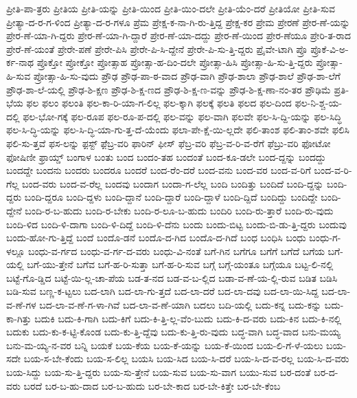 {ಪ್ರೀತಿ-ಪಾ-ತ್ರರು
ಪ್ರೀತಿಯ
ಪ್ರೀತಿ-ಯನ್ನು
ಪ್ರೀತಿ-ಯಿಂದ
ಪ್ರೀತಿ-ಯಿಂ-ದಲೇ
ಪ್ರೀತಿ-ಯೆಂ-ದರೆ
ಪ್ರೀತಿಯೋ
ಪ್ರೀತಿ-ಸುವ
ಪ್ರೀತ್ಯಾ-ದ-ರ-ಗ-ಳಿಂದ
ಪ್ರೀತ್ಯಾ-ದ-ರ-ಗಳೂ
ಪ್ರೆಮ
ಪ್ರೇಕ್ಷ-ಕ-ನಾ-ಗಿ-ರು-ತ್ತಿದ್ದ
ಪ್ರೇಕ್ಷ-ಕರ
ಪ್ರೇಮ
ಪ್ರೇರಣೆ
ಪ್ರೇರ-ಣೆ-ಯನ್ನು
ಪ್ರೇರ-ಣೆ-ಯಾ-ಗಿ-ದ್ದರು
ಪ್ರೇರ-ಣೆ-ಯಾ-ಗಿ-ದ್ದಾರೆ
ಪ್ರೇರ-ಣೆ-ಯಾ-ದದ್ದು
ಪ್ರೇರ-ಣೆ-ಯಿಂದ
ಪ್ರೇರ-ಣೆಯೂ
ಪ್ರೇರಿ-ತ-ರಾದ
ಪ್ರೇರೆ-ಣೆ-ಯಂತೆ
ಪ್ರೇರೇ-ಪಣೆ
ಪ್ರೇರೇ-ಪಿಸಿ
ಪ್ರೇರೇ-ಪಿ-ಸಿ-ದ್ದೇನೆ
ಪ್ರೇರೇ-ಪಿ-ಸು-ತ್ತಿ-ದ್ದರು
ಪ್ರೈವೇ-ಟಾಗಿ
ಪ್ರೊ
ಪ್ರೊಕೆ-ವಿ-ಅ-ರ್ಕ-ನಾಥ
ಪ್ರೊಕ್ತೋ
ಪ್ರೋಕ್ತೋ
ಪ್ರೋತ್ಸಾಹ
ಪ್ರೋತ್ಸಾ-ಹ-ದಿಂ-ದಲೇ
ಪ್ರೋತ್ಸಾ-ಹಿಸಿ
ಪ್ರೋತ್ಸಾ-ಹಿ-ಸು-ತ್ತಿ-ದ್ದರು
ಪ್ರೋತ್ಸಾ-ಹಿ-ಸುವ
ಪ್ರೋತ್ಸಾ-ಹಿ-ಸು-ವುದು
ಪ್ರೌಢ
ಪ್ರೌಢ-ಪಾ-ಠ-ವಾದ
ಪ್ರೌಢ-ವಾಗಿ
ಪ್ರೌಢ-ಶಾಲಾ
ಪ್ರೌಢ-ಶಾಲೆ
ಪ್ರೌಢ-ಶಾ-ಲೆಗೆ
ಪ್ರೌಢ-ಶಾ-ಲೆ-ಯಲ್ಲಿ
ಪ್ರೌಢ-ಶಿ-ಕ್ಷಣ
ಪ್ರೌಢ-ಶಿ-ಕ್ಷ-ಣದ
ಪ್ರೌಢ-ಶಿ-ಕ್ಷ-ಣ-ವನ್ನು
ಪ್ರೌಢ-ಶಿ-ಕ್ಷ-ಣಾ-ನಂ-ತರ
ಪ್ರೌಢಿಮೆ
ಪ್ರತಿ-ಭೆಯ
ಫಲ
ಫಲಂ
ಫಲಂತಿ
ಫಲ-ಕಾ-ರಿ-ಯಾ-ಗ-ಲಿಲ್ಲ
ಫಲ-ಕ್ಕಾಗಿ
ಫಲಕ್ಕೆ
ಫಲತಿ
ಫಲದ
ಫಲ-ದಿಂದ
ಫಲ-ನಿ-ಶ್ಚ-ಯ-ದಲ್ಲಿ
ಫಲ-ಭೋ-ಗಕ್ಕೆ
ಫಲ-ರೂಪ
ಫಲ-ರೂ-ಪ-ದಲ್ಲಿ
ಫಲ-ವನ್ನು
ಫಲ-ವಾಗಿ
ಫಲವೇ
ಫಲ-ಸಿ-ದ್ದಿ-ಯನ್ನು
ಫಲ-ಸಿದ್ಧಿ
ಫಲ-ಸಿ-ದ್ಧಿ-ಯನ್ನು
ಫಲ-ಸಿ-ದ್ಧಿ-ಯಾ-ಗು-ತ್ತ-ದೆ-ಯೆಂದು
ಫಲಾ-ಪೇ-ಕ್ಷೆ-ಯಿ-ಲ್ಲದೇ
ಫಲಿ-ತಾಂಶ
ಫಲಿ-ತಾಂ-ಶವೇ
ಫಲಿಸಿ
ಫಲಿ-ಸು-ತ್ತವೆ
ಫಸ-ಲನ್ನು
ಫ಼ಸ್ಟ್
ಫ಼ೆಬ್ರ-ವರಿ
ಫಾರಿನ್
ಫೀಸ್
ಫೆಬ್ರ-ವರಿ
ಫೆಬ್ರ-ವ-ರಿ-ವ-ರೆಗೆ
ಫೆಬ್ರು-ವರಿ
ಫೋಟೋ
ಫೋಷಿಣೀ
ಫ್ರಾಯ್ಡ್
ಬಂಗಾಳ
ಬಂತು
ಬಂದ
ಬಂದಂ-ತಹ
ಬಂದಂತೆ
ಬಂದ-ಕೂ-ಡಲೇ
ಬಂದ-ದ್ದನ್ನು
ಬಂದದ್ದು
ಬಂದದ್ದೇ
ಬಂದನು
ಬಂದರು
ಬಂದರೂ
ಬಂದರೆ
ಬಂದ-ರೆಂ-ದರೆ
ಬಂದ-ವನು
ಬಂದ-ವರ
ಬಂದ-ವ-ರಿಗೆ
ಬಂದ-ವ-ರಿ-ಗೆಲ್ಲ
ಬಂದ-ವರು
ಬಂದ-ವ-ರೆಲ್ಲ
ಬಂದವು
ಬಂದಾಗ
ಬಂದಾ-ಗ-ಲೆಲ್ಲ
ಬಂದಿ
ಬಂದಿತ್ತು
ಬಂದಿದೆ
ಬಂದಿ-ದ್ದನ್ನು
ಬಂದಿ-ದ್ದರು
ಬಂದಿ-ದ್ದರೂ
ಬಂದಿ-ದ್ದಳು
ಬಂದಿ-ದ್ದಾನೆ
ಬಂದಿ-ದ್ದಾರೆ
ಬಂದಿ-ದ್ದಾಳೆ
ಬಂದಿ-ದ್ದಿದೆ
ಬಂದಿದ್ದು
ಬಂದಿದ್ದೇ
ಬಂದಿ-ದ್ದೇನೆ
ಬಂದಿ-ರ-ಬ-ಹುದು
ಬಂದಿ-ರ-ಬೇಕು
ಬಂದಿ-ರ-ಲೂ-ಬ-ಹುದು
ಬಂದಿರಿ
ಬಂದಿ-ರು-ತ್ತಾರೆ
ಬಂದಿ-ರು-ವುದು
ಬಂದಿ-ಳಿದ
ಬಂದಿ-ಳಿ-ದಾಗಾ
ಬಂದಿ-ಳಿ-ದಿದ್ದೆ
ಬಂದಿ-ಳಿ-ದೆನು
ಬಂದು
ಬಂದು-ಬಿಟ್ಟ
ಬಂದು-ಬಿ-ಡು-ತ್ತಿ-ದ್ದರು
ಬಂದುವು
ಬಂದು-ಹೋ-ಗು-ತ್ತಿದ್ದೆ
ಬಂದೆ
ಬಂದೊ-ಡನೆ
ಬಂದೊ-ದ-ಗಿದ
ಬಂದೊ-ದ-ಗಿದೆ
ಬಂಧ
ಬಂಧಿಸಿ
ಬಂಧು
ಬಂಧು-ಗ-ಳಲ್ಲೂ
ಬಂಧು-ವ-ರ್ಗದ
ಬಂಧು-ವ-ರ್ಗ-ದ-ವರು
ಬಂಧು-ವಿ-ನಂತೆ
ಬಗೆ-ಗಿನ
ಬಗೆಗೂ
ಬಗೆಗೆ
ಬಗೆದೆ
ಬಗೆಯ
ಬಗೆ-ಯಲ್ಲಿ
ಬಗೆ-ಯು-ತ್ತೇನೆ
ಬಗೆವ
ಬಗೆ-ಹ-ರಿ-ಸುತ್ತಾ
ಬಗೆ-ಹ-ರಿ-ಸುವ
ಬಗ್ಗೆ
ಬಗ್ಗೆ-ಯಂತೂ
ಬಗ್ಗೆಯೂ
ಬಟ್ಟ-ಲಿ-ನಲ್ಲಿ
ಬಟ್ಟೆ-ಗೊ-ಡ್ಡಿದ
ಬಟ್ಟೆ-ಯಿ-ಲ್ಲ-ಚಾ-ಪೆಯ
ಬಡ-ತ-ನದ
ಬಡ-ವ-ಬ-ಲ್ಲಿದ
ಬಡಾ-ವ-ಣೆ-ಯ-ಲ್ಲಿ-ರುವ
ಬಡಿತ
ಬಡಿಸಿ
ಬಡಿ-ಸುವ
ಬಣ್ಣ-ಕ-ಟ್ಟಲು
ಬದ-ಲಾಗಿ
ಬದ-ಲಾ-ಗು-ತ್ತದೆ
ಬದ-ಲಾ-ದರೆ
ಬದ-ಲಾ-ದವು
ಬದ-ಲಾ-ಯಿ-ಸಿದ್ದ
ಬದ-ಲಾ-ವ-ಣೆ-ಗಳ
ಬದ-ಲಾ-ವ-ಣೆ-ಗ-ಳಾ-ಗಿವೆ
ಬದ-ಲಾ-ವ-ಣೆ-ಯಾಗಿ
ಬದಲು
ಬದಿ-ಯಲ್ಲಿ
ಬದು-ಕನ್ನ
ಬದು-ಕನ್ನು
ಬದು-ಕಾ-ಗಿತ್ತು
ಬದುಕಿ
ಬದು-ಕಿ-ಗಾಗಿ
ಬದು-ಕಿಗೆ
ಬದು-ಕಿ-ತ್ತಿ-ಲ್ಲ-ವೆಂ-ಬುದು
ಬದು-ಕಿ-ದ-ವರು
ಬದು-ಕಿನ
ಬದು-ಕಿ-ನಲ್ಲಿ
ಬದುಕು
ಬದು-ಕು-ಕ-ಟ್ಟಿ-ಕೊಂಡ
ಬದು-ಕು-ತ್ತಿ-ದ್ದೆವು
ಬದು-ಕು-ತ್ತಿ-ರು-ವುದು
ಬದ್ಧ-ವಾಗಿ
ಬದ್ಧ-ವಾದ
ಬನು-ಮಯ್ಯ
ಬನು-ಮ-ಯ್ಯ-ನ-ವರ
ಬನ್ನಿ
ಬಯಕೆ
ಬಯ-ಕೆಯ
ಬಯ-ಕೆ-ಯನ್ನು
ಬಯ-ಕೆ-ಯಿಂದ
ಬಯ-ಲಿ-ಗೆ-ಳೆ-ಯಲು
ಬಯ-ಸದೇ
ಬಯ-ಸ-ಬೇ-ಕೆಂದು
ಬಯ-ಸ-ಲಿಲ್ಲ
ಬಯಸಿ
ಬಯ-ಸಿದ
ಬಯ-ಸಿ-ದರೆ
ಬಯ-ಸಿ-ದ-ವ-ರಲ್ಲ
ಬಯ-ಸಿ-ದ-ವರು
ಬಯ-ಸಿದ್ದು
ಬಯ-ಸು-ತ್ತಿ-ದ್ದರು
ಬಯ-ಸು-ತ್ತೇನೆ
ಬಯ-ಸುವ
ಬಯ-ಸು-ವಾಗ
ಬಯು-ಸುವ
ಬರ-ದಂತೆ
ಬರ-ದ-ವರು
ಬರದೆ
ಬರ-ಬ-ಹು-ದಾದ
ಬರ-ಬ-ಹುದು
ಬರ-ಬೇ-ಕಾದ
ಬರ-ಬೇ-ಕಿತ್ತೇ
ಬರ-ಬೇ-ಕೆಂಬ
}
